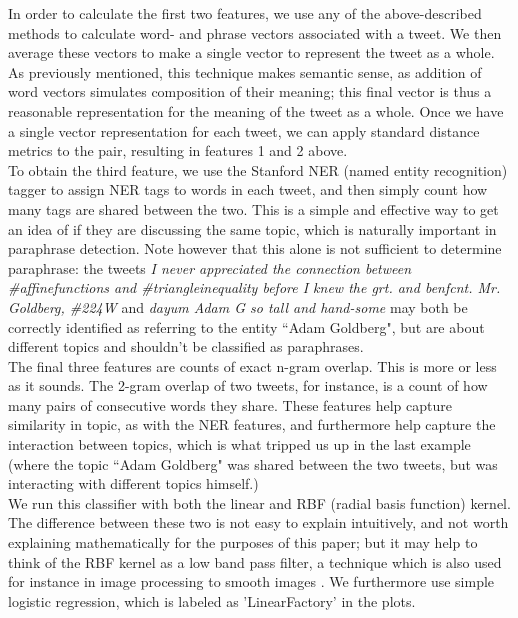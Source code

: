 \documentclass[conference]{IEEEtran}
\begin{document}
In order to calculate the first two features, we use any of the above-described methods to calculate word- and phrase vectors associated with a tweet. We then average these vectors to make a single vector to represent the tweet as a whole.  As previously mentioned, this technique makes semantic sense, as addition of word vectors simulates composition of their meaning; this final vector is thus a reasonable representation for the meaning of the tweet as a whole.  Once we have a single vector representation for each tweet, we can apply standard distance metrics to the pair, resulting in features 1 and 2 above.\\
\indent To obtain the third feature, we use the Stanford NER (named entity recognition) tagger to assign NER tags to words in each tweet, and then simply count how many tags are shared between the two.  This is a simple and effective way to get an idea of if they are discussing the same topic, which is naturally important in paraphrase detection.  Note however that this alone is not sufficient to determine paraphrase: the tweets \emph{I never appreciated the connection between \#affinefunctions and \#triangleinequality before I knew the grt. and benfcnt. Mr. Goldberg, \#224W} and \emph{dayum Adam G so tall and hand-some} may both be correctly identified as referring to the entity ``Adam Goldberg", but are about different topics and shouldn't be classified as paraphrases.\\
\indent The final three features are counts of exact n-gram overlap.  This is more or less as it sounds.  The 2-gram overlap of two tweets, for instance, is a count of how many pairs of consecutive words they share.  These features help capture similarity in topic, as with the NER features, and furthermore help capture the interaction between topics, which is what tripped us up in the last example (where the topic ``Adam Goldberg" was shared between the two tweets, but was interacting with different topics himself.) \\
\indent We run this classifier with both the linear and RBF (radial basis function) kernel.  The difference between these two is not easy to explain intuitively, and not worth explaining mathematically for the purposes of this paper; but it may help to think of the RBF kernel as a low band pass filter, a technique which is also used for instance in image processing to smooth images \cite{RBF}. We furthermore use simple logistic regression, which is labeled as 'LinearFactory' in the plots.
\end{document}
